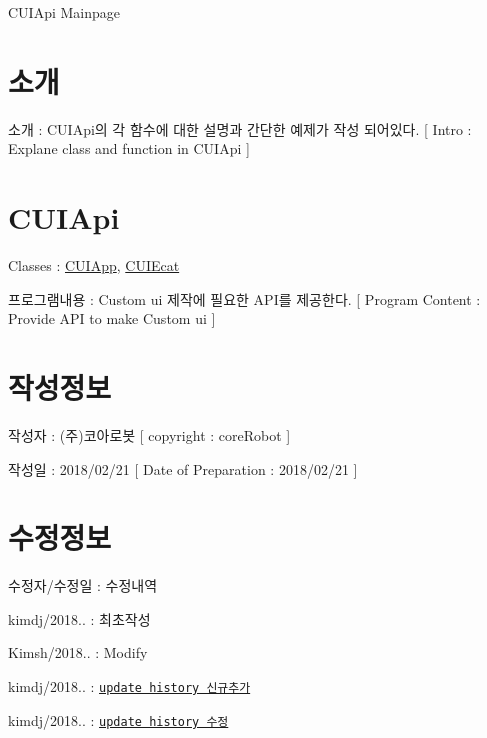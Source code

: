 C\-U\-I\-Api Mainpage \hypertarget{index_intro}{}\section{소개}\label{index_intro}

\begin{DoxyItemize}
\item 소개 \-: C\-U\-I\-Api의 각 함수에 대한 설명과 간단한 예제가 작성 되어있다. \mbox{[} Intro \-: Explane class and function in C\-U\-I\-Api \mbox{]} 
\end{DoxyItemize}\hypertarget{index_CUIApi}{}\section{C\-U\-I\-Api}\label{index_CUIApi}

\begin{DoxyItemize}
\item Classes \-: \hyperlink{classCUIApp}{C\-U\-I\-App}, \hyperlink{classCUIEcat}{C\-U\-I\-Ecat}
\item 프로그램내용 \-: Custom ui 제작에 필요한 A\-P\-I를 제공한다. \mbox{[} Program Content \-: Provide A\-P\-I to make Custom ui \mbox{]} 
\end{DoxyItemize}\hypertarget{index_CREATEINFO}{}\section{작성정보}\label{index_CREATEINFO}

\begin{DoxyItemize}
\item 작성자 \-: (주)코아로봇 \mbox{[} copyright \-: core\-Robot \mbox{]}
\item 작성일 \-: 2018/02/21 \mbox{[} Date of Preparation \-: 2018/02/21 \mbox{]} 
\end{DoxyItemize}\hypertarget{index_MODIFYINFO}{}\section{수정정보}\label{index_MODIFYINFO}

\begin{DoxyItemize}
\item 수정자/수정일 \-: 수정내역
\item kimdj/2018.. \-: 최초작성
\item Kimsh/2018.. \-: Modify
\item kimdj/2018.. \-: \href{file:md_CuiHistory.html}{\tt update history 신규추가}
\item kimdj/2018.. \-: \href{file:md_CuiHistory.html}{\tt update history 수정} 
\end{DoxyItemize}